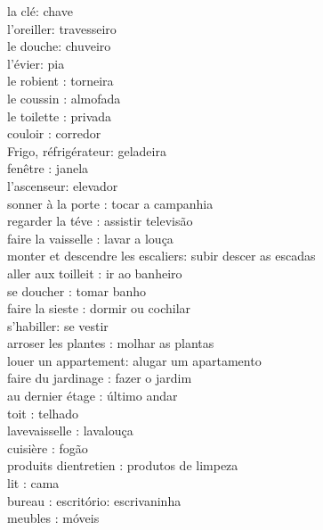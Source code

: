 \documentclass{article}
\begin{document}
        la clé: chave\\
        l'oreiller: travesseiro\\
        le douche: chuveiro\\
        l'évier: pia\\
        le    robient       : torneira\\
        le    coussin       : almofada\\
        le    toilette      : privada\\
              couloir       : corredor\\
        Frigo, réfrigérateur: geladeira\\
              fenêtre       : janela\\
        l'ascenseur: elevador\\
        sonner   à la porte                : tocar a campanhia\\
        regarder la téve                   : assistir televisão\\
        faire    la vaisselle              : lavar a louça\\
        monter   et descendre les escaliers: subir descer as escadas\\
        aller    aux toilleit              : ir ao banheiro\\
        se       doucher                   : tomar banho\\
        faire    la sieste                 : dormir ou cochilar\\
        s'habiller: se vestir\\
        arroser  les plantes   : molhar as plantas\\
        louer    un appartement: alugar um apartamento\\
        faire    du jardinage  : fazer o jardim\\
        au       dernier étage : último andar\\
                 toit          : telhado\\
                 lavevaisselle : lavalouça\\
                 cuisière      : fogão\\
        produits dientretien   : produtos de limpeza\\
                 lit           : cama\\
                 bureau        : escritório: escrivaninha\\
                 meubles       : móveis\\
\end{document}
